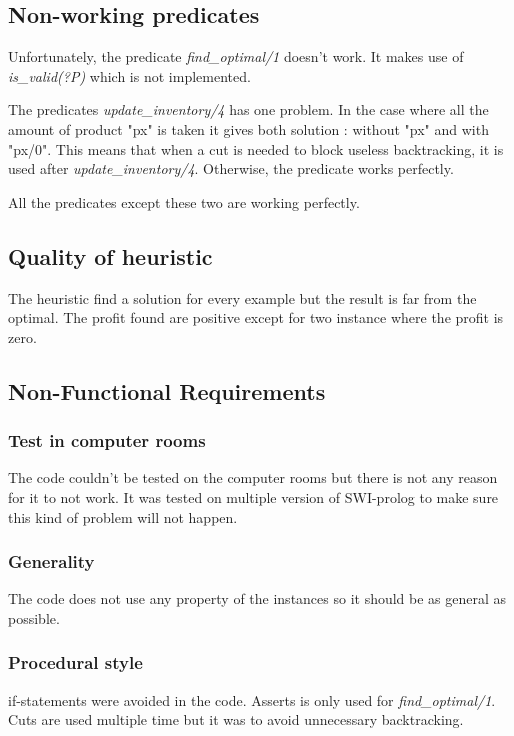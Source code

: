 \documentclass{article}
\begin{document}
\subsection{Non-working predicates}

Unfortunately, the predicate \textit{find\_optimal/1} doesn't work. It makes use of \textit{is\_valid(?P)} which is not implemented.

The predicates \textit{update\_inventory/4} has one problem. In the case where all the amount of product "px" is taken it gives both solution : without "px" and with "px/0". This means that when a cut is needed to block useless backtracking, it is used after \textit{update\_inventory/4}. Otherwise, the predicate works perfectly.

All the predicates except these two are working perfectly.

\subsection{Quality of heuristic}

The heuristic find a solution for every example but the result is far from the optimal. The profit found are positive except for two instance where the profit is zero.

\subsection{Non-Functional Requirements}

\subsubsection{Test in computer rooms}
The code couldn't be tested on the computer rooms but there is not any reason for it to not work. It was tested on multiple version of SWI-prolog to make sure this kind of problem will not happen.

\subsubsection{Generality}

The code does not use any property of the instances so it should be as general as possible.

\subsubsection{Procedural style}
if-statements were avoided in the code. Asserts is only used for \textit{find\_optimal/1}. Cuts are used multiple time but it was to avoid unnecessary backtracking.
\end{document}
